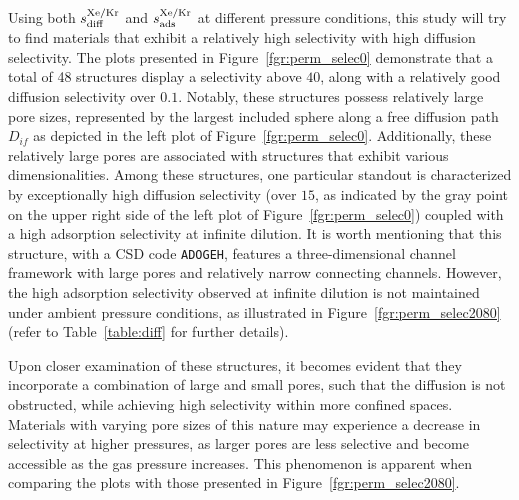 \documentclass[main]{subfiles}
\begin{document}
Using both $s^{\text{Xe/Kr}}_{\text{diff}}$ and $s^{\text{Xe/Kr}}_{\text{ads}}$ at different pressure conditions, this study will try to find materials that exhibit a relatively high selectivity with high diffusion selectivity. The plots presented in Figure~\ref{fgr:perm_selec0} demonstrate that a total of 48 structures display a selectivity above $40$, along with a relatively good diffusion selectivity over $0.1$. Notably, these structures possess relatively large pore sizes, represented by the largest included sphere along a free diffusion path $D_{if}$ as depicted in the left plot of Figure~\ref{fgr:perm_selec0}. Additionally, these relatively large pores are associated with structures that exhibit various dimensionalities. Among these structures, one particular standout is characterized by exceptionally high diffusion selectivity (over $15$, as indicated by the gray point on the upper right side of the left plot of Figure~\ref{fgr:perm_selec0}) coupled with a high adsorption selectivity at infinite dilution. It is worth mentioning that this structure, with a CSD code \texttt{ADOGEH}\cite{Peikert_2012}, features a three-dimensional channel framework with large pores and relatively narrow connecting channels. However, the high adsorption selectivity observed at infinite dilution is not maintained under ambient pressure conditions, as illustrated in Figure~\ref{fgr:perm_selec2080} (refer to Table~\ref{table:diff} for further details).

Upon closer examination of these structures, it becomes evident that they incorporate a combination of large and small pores, such that the diffusion is not obstructed, while achieving high selectivity within more confined spaces. Materials with varying pore sizes of this nature may experience a decrease in selectivity at higher pressures, as larger pores are less selective and become accessible as the gas pressure increases. This phenomenon is apparent when comparing the plots with those presented in Figure~\ref{fgr:perm_selec2080}.
\end{document}
